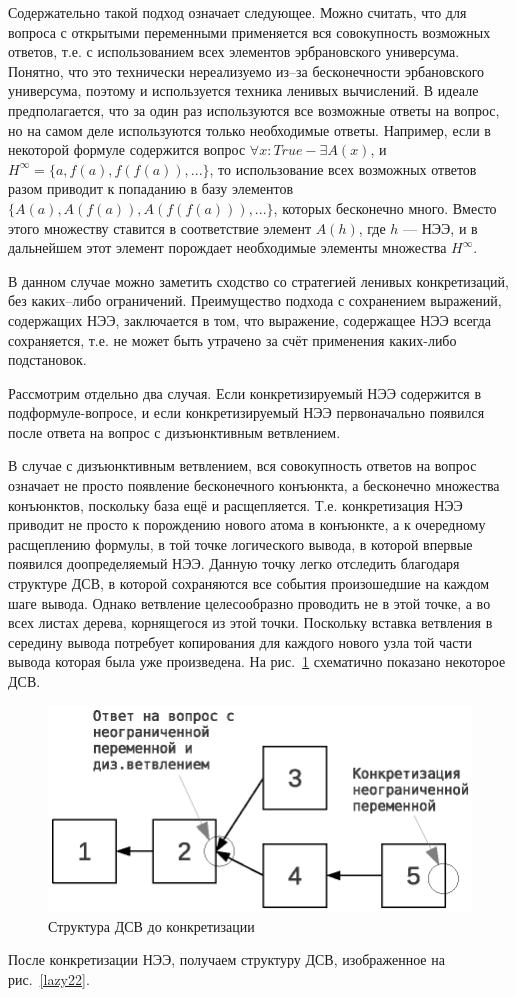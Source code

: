 Содержательно такой подход означает следующее. Можно считать, что для вопроса с открытыми переменными применяется вся совокупность возможных ответов, т.е. с использованием всех элементов эрбрановского универсума. Понятно, что это технически нереализуемо из--за бесконечности эрбановского универсума, поэтому и используется техника ленивых вычислений. В идеале предполагается, что за один раз используются все возможные ответы на вопрос, но на самом деле используются только необходимые ответы. Например, если в некоторой формуле содержится вопрос $\forall x: True  - \exists A(x)$, и $H^{\infty}= \{a, f(a), f(f(a)), ...\}$, то использование всех возможных ответов разом приводит к попаданию в базу элементов $\{A(a), A(f(a)), A(f(f(a))), ...\}$, которых бесконечно много. Вместо этого множеству ставится в соответствие элемент $A(h)$, где $h$ --- НЭЭ, и в дальнейшем этот элемент порождает необходимые элементы множества $H^{\infty}$.

В данном случае можно заметить сходство со стратегией ленивых конкретизаций, без каких--либо ограничений. Преимущество подхода с сохранением выражений, содержащих НЭЭ, заключается в том, что выражение, содержащее НЭЭ всегда сохраняется, т.е. не может быть утрачено за счёт применения каких-либо подстановок.

Рассмотрим отдельно два случая. Если конкретизируемый НЭЭ содержится в подформуле-вопросе, и если конкретизируемый НЭЭ первоначально появился после ответа на вопрос с дизъюнктивным ветвлением.

В случае с дизъюнктивным ветвлением, вся совокупность ответов на вопрос означает не просто появление бесконечного конъюнкта, а бесконечно множества конъюнктов, поскольку база ещё и расщепляется. Т.е. конкретизация НЭЭ приводит не просто к порождению нового атома в конъюнкте, а к очередному расщеплению формулы, в той точке логического вывода, в которой впервые появился доопределяемый НЭЭ. Данную точку легко отследить благодаря структуре ДСВ, в которой сохраняются все события произошедшие на каждом шаге вывода. Однако ветвление целесообразно проводить не в этой точке, а во всех листах дерева, корнящегося из этой точки. Поскольку вставка ветвления в середину вывода потребует копирования для каждого нового узла той части вывода которая была уже произведена.  На рис.~\ref{lazy21} схематично показано некоторое ДСВ.
\begin{figure}[h]
	\centering
	\includegraphics[width=0.5\linewidth]{pics/Lazy21.eps}
	\caption{Структура ДСВ до конкретизации}
	\label{lazy21}
\end{figure}
После конкретизации НЭЭ, получаем структуру ДСВ, изображенное на рис.~\ref{lazy22}.

